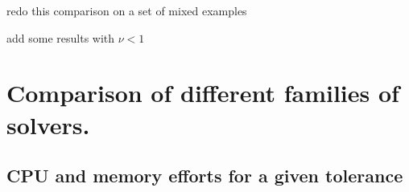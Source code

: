 \begin{ndrva}
  \item redo this comparison on a set of mixed examples 
  \item add some results with $\nu < 1 $
\end{ndrva}


\section{Comparison of different families of solvers.}









\subsection{CPU and memory efforts for a given tolerance}

